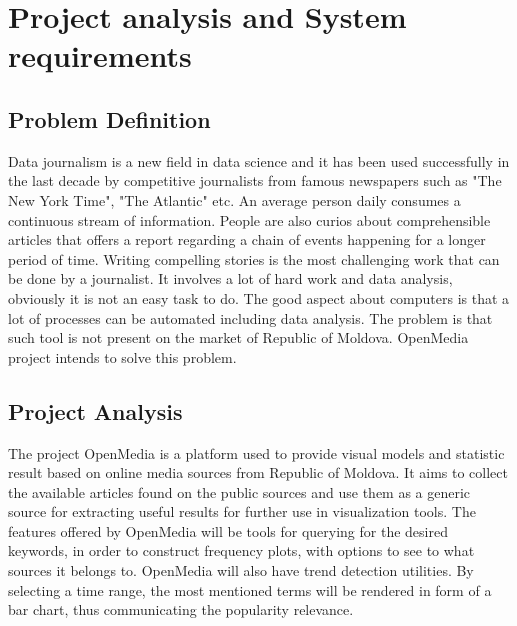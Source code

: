 \section{Project analysis and System requirements}

\subsection{Problem Definition}
Data journalism is a new field in data science and it has been used  successfully in the last decade by competitive journalists from famous newspapers such as "The New York Time", "The Atlantic" etc. An average person daily consumes a continuous stream of information. People are also curios about comprehensible articles that offers a report regarding a chain of events happening for a longer period of time. Writing compelling stories is the most challenging work that can be done by a journalist. It involves a lot of hard work and data analysis, obviously it is not an easy task to do. The good aspect about computers is that a lot of processes can be automated including data analysis. The problem is that such tool is not present on the market of Republic of Moldova. OpenMedia project intends to solve this problem.

\subsection{Project Analysis}
The project OpenMedia is a platform used to provide visual models and statistic result based on online media sources from Republic of Moldova. It aims to collect the available articles found on the public sources and use them as a generic source for extracting useful results for further use in visualization tools. The features offered by OpenMedia will be tools for querying for the desired keywords, in order to construct frequency plots, with options to see to what sources it belongs to. OpenMedia will also have trend detection utilities. By selecting a time range, the most mentioned terms will be rendered in form of a bar chart, thus communicating the popularity relevance.

